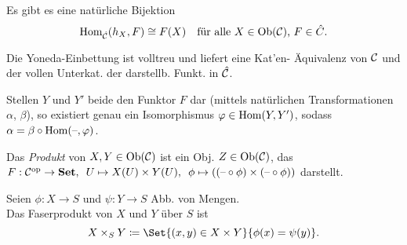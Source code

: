\documentclass{cheat-sheet}
\newenvironment{centertikz}
  {\begin{center}\begin{tikzpicture}}
  {\end{tikzpicture}\end{center}}
\begin{document}
\begin{kor}
  Es gibt es eine natürliche Bijektion
  \[
    \operatorname{Hom}_{\hat{\mathcal{C}}}(h_X, F) \cong F(X) \quad
    \text{für alle $X \in \operatorname{Ob}(\mathcal{C})$, $F \in \hat{C}$.}
  \]
\end{kor}

\begin{kor}
  Die Yoneda-Einbettung ist volltreu und liefert eine Kat'en- Äquivalenz von $\mathcal{C}$ und der vollen Unterkat. der darstellb. Funkt. in $\hat{\mathcal{C}}$.
\end{kor}

\begin{kor}
  Stellen $Y$ und $Y'$ beide den Funktor $F$ dar (mittels natürlichen Transformationen $\alpha$, $\beta$), so existiert genau ein Isomorphismus $\varphi \in \operatorname{Hom}(Y, Y')$, sodass $\alpha = \beta \circ \operatorname{Hom}(\text{--}, \varphi)$.
\end{kor}

\begin{defn}
  Das \emph{Produkt} von $X, Y \in \operatorname{Ob}(\mathcal{C})$ ist ein Obj. $Z \in \operatorname{Ob}(\mathcal{C})$, das
  $F : \mathcal{C}^{\mathrm{op}} \to \mathbf{Set}, \enspace U \mapsto X(U) \times Y(U), \enspace \phi \mapsto ((\text{--} \circ \phi) \times (\text{--} \circ \phi))$ darstellt.
\end{defn}


\begin{defn}
  Seien $\phi : X \to S$ und $\psi : Y \to S$ Abb. von Mengen. \\
  Das Faserprodukt von $X$ und $Y$ über $S$ ist
  \[ X \times_S Y \coloneqq \Set{ (x, y) \in X \times Y }{ \phi(x) = \psi(y) }. \]
\end{defn}
\end{document}
